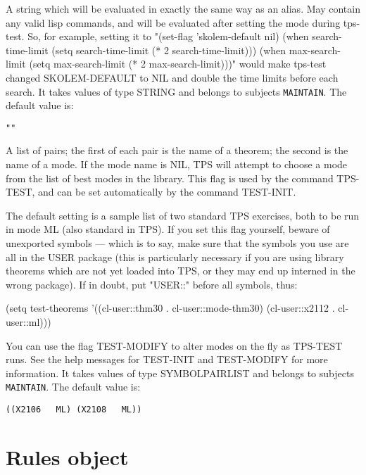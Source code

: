 \begin{description}
\item[TEST-MODIFY]  
A string which will be evaluated in exactly the same way as an alias.
May contain any valid lisp commands, and will be evaluated after setting the 
mode during tps-test. So, for example, setting it to 
"(set-flag 'skolem-default nil) 
(when search-time-limit (setq search-time-limit (* 2 search-time-limit)))
(when max-search-limit (setq max-search-limit (* 2 max-search-limit)))"
would make tps-test changed SKOLEM-DEFAULT to NIL and double the time limits
before each search.
It takes values of type STRING and belongs to subjects \texttt{MAINTAIN}.  The default value is: \begin{lstlisting}
""
\end{lstlisting}

\item[TEST-THEOREMS]  
A list of pairs; the first of each pair is the name of a theorem; 
the second is the name of a mode. If the mode name is NIL, TPS will 
attempt to choose a mode from the list of best modes in the library.
This flag is used by the command TPS-TEST, and can be set automatically by
the command TEST-INIT.

The default setting is a sample list of two standard TPS exercises, both 
to be run in mode ML (also standard in TPS). If you set this flag yourself,
beware of unexported symbols --- which is to say, make sure that the 
symbols you use are all in the USER package (this is particularly 
necessary if you are using library theorems which are not yet loaded
into TPS, or they may end up interned in the wrong package). If in doubt,
put "USER::" before all symbols, thus:

(setq test-theorems '((cl-user::thm30 . cl-user::mode-thm30) (cl-user::x2112 . cl-user::ml)))

You can use the flag TEST-MODIFY to alter modes on the fly as TPS-TEST runs.
See the help messages for TEST-INIT and TEST-MODIFY for more information.
It takes values of type SYMBOLPAIRLIST and belongs to subjects \texttt{MAINTAIN}.  The default value is: \begin{lstlisting}
((X2106   ML) (X2108   ML))
\end{lstlisting}

\item
\end{description}

\section{Rules object}

